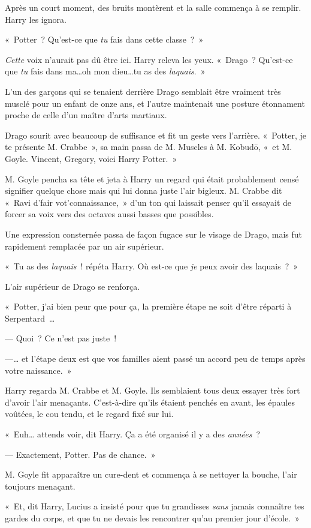 Après un court moment, des bruits montèrent et la salle commença à se remplir. Harry les ignora.

«~Potter~? Qu'est-ce que \emph{tu} fais dans cette classe~?~»

\emph{Cette} voix n'aurait pas dû être ici. Harry releva les yeux. «~Drago~? Qu'est-ce que \emph{tu} fais dans ma…oh mon dieu…tu as des \emph{laquais}.~»

L'un des garçons qui se tenaient derrière Drago semblait être vraiment très musclé pour un enfant de onze ans, et l'autre maintenait une posture étonnament proche de celle d'un maître d'arts martiaux.

Drago sourit avec beaucoup de suffisance et fit un geste vers l'arrière. «~Potter, je te présente M. Crabbe~», sa main passa de M. Muscles à M. Kobudō, «~et M. Goyle. Vincent, Gregory, voici Harry Potter.~»

M. Goyle pencha sa tête et jeta à Harry un regard qui était probablement censé signifier quelque chose mais qui lui donna juste l'air bigleux. M. Crabbe dit «~Ravi d'fair vot'connaissance,~» d'un ton qui laissait penser qu'il essayait de forcer sa voix vers des octaves aussi basses que possibles.

Une expression consternée passa de façon fugace sur le visage de Drago, mais fut rapidement remplacée par un air supérieur.

«~Tu as des \emph{laquais}~! répéta Harry. Où est-ce que \emph{je} peux avoir des laquais~?~»

L'air supérieur de Drago se renforça.

«~Potter, j'ai bien peur que pour ça, la première étape ne soit d'être réparti à Serpentard~…

--- Quoi~? Ce n'est pas juste~!

---… et l'étape deux est que vos familles aient passé un accord peu de temps après votre naissance.~»

Harry regarda M. Crabbe et M. Goyle. Ils semblaient tous deux essayer très fort d'avoir l'air menaçants. C'est-à-dire qu'ils étaient penchés en avant, les épaules voûtées, le cou tendu, et le regard fixé sur lui.

«~Euh… attends voir, dit Harry. Ça a été organisé il y a des \emph{années}~?

--- Exactement, Potter. Pas de chance.~»

M. Goyle fit apparaître un cure-dent et commença à se nettoyer la bouche, l'air toujours menaçant.

«~Et, dit Harry, Lucius a insisté pour que tu grandisses \emph{sans} jamais connaître tes gardes du corps, et que tu ne devais les rencontrer qu'au premier jour d'école.~»

